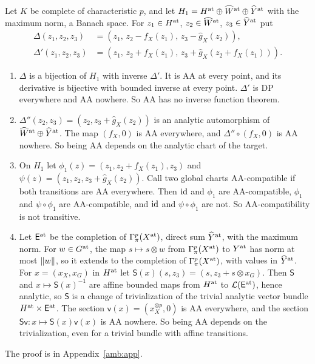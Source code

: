 \begin{corollary}\label{amb:cor:charts}
Let $K$ be complete of characteristic $p$, and let $H_1=H^{\rm at}\oplus\widehat W^{\rm at}\oplus\widehat Y^{\rm at}$ with the maximum norm, a Banach space. For $z_1\in H^{\rm at}$, $z_2\in\widehat W^{\rm at}$, $z_3\in\widehat Y^{\rm at}$ put
\begin{equation}\label{amb:eq:delta}
\begin{aligned}
 \Delta(z_1,z_2,z_3)&=(z_1,\,z_2-f_X(z_1),\,z_3-\hat g_X(z_2)),\\
 \Delta'(z_1,z_2,z_3)&=(z_1,\,z_2+f_X(z_1),\,z_3+\hat g_X(z_2+f_X(z_1))).
\end{aligned}
\end{equation}
\begin{enumerate}
\item $\Delta$ is a bijection of $H_1$ with inverse $\Delta'$. It is AA at every point, and its derivative is bijective with bounded inverse at every point. $\Delta'$ is DP everywhere and AA nowhere. So AA has no inverse function theorem.
\item $\Delta''(z_2,z_3)=(z_2,z_3+\hat g_X(z_2))$ is an analytic automorphism of $\widehat W^{\rm at}\oplus\widehat Y^{\rm at}$. The map $(f_X,0)$ is AA everywhere, and $\Delta''\circ(f_X,0)$ is AA nowhere. So being AA depends on the analytic chart of the target.
\item On $H_1$ let $\phi_1(z)=(z_1,z_2+f_X(z_1),z_3)$ and $\psi(z)=(z_1,z_2,z_3+\hat g_X(z_2))$. Call two global charts AA-compatible if both transitions are AA everywhere. Then $\mathrm{id}$ and $\phi_1$ are AA-compatible, $\phi_1$ and $\psi\circ\phi_1$ are AA-compatible, and $\mathrm{id}$ and $\psi\circ\phi_1$ are not. So AA-compatibility is not transitive.
\item Let $\mathsf E^{\rm at}$ be the completion of $\Gamma^p_\pi(X^{\rm at})$, direct sum $\widehat Y^{\rm at}$, with the maximum norm. For $w\in G^{\rm at}$, the map $s\mapsto s\otimes w$ from $\Gamma^p_\pi(X^{\rm at})$ to $Y^{\rm at}$ has norm at most $\lVert w\rVert$, so it extends to the completion of $\Gamma^p_\pi(X^{\rm at})$, with values in $\widehat Y^{\rm at}$. For $x=(x_X,x_G)$ in $H^{\rm at}$ let $\mathsf S(x)(s,z_3)=(s,z_3+s\otimes x_G)$. Then $\mathsf S$ and $x\mapsto\mathsf S(x)^{-1}$ are affine bounded maps from $H^{\rm at}$ to $\mathcal L(\mathsf E^{\rm at})$, hence analytic, so $\mathsf S$ is a change of trivialization of the trivial analytic vector bundle $H^{\rm at}\times\mathsf E^{\rm at}$. The section $\mathsf v(x)=(x_X^{\otimes p},0)$ is AA everywhere, and the section $\mathsf S\mathsf v\colon x\mapsto\mathsf S(x)\mathsf v(x)$ is AA nowhere. So being AA depends on the trivialization, even for a trivial bundle with affine transitions.
\end{enumerate}
\end{corollary}
The proof is in Appendix~\ref{amb:app}.

